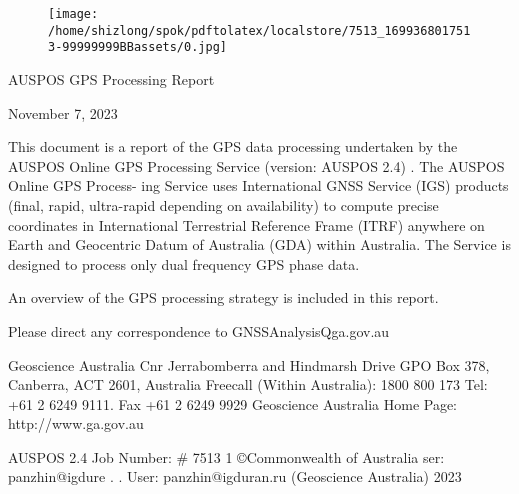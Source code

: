 \documentclass[a4paper,12pt]{article}
\begin{document}
\begin{figure}[h]

\texttt{[image: /home/shizlong/spok/pdftolatex/localstore/7513\_1699368017513-99999999BBassets/0.jpg]}

\centering

\end{figure}

    AUSPOS GPS Processing Report 

\vspace{10pt}

    November 7, 2023 

\vspace{10pt}

    This document is a report of the GPS data processing undertaken by the AUSPOS Online  GPS Processing Service (version: AUSPOS 2.4) . The AUSPOS Online GPS Process-  ing Service uses International GNSS Service (IGS) products (final, rapid, ultra-rapid  depending on availability) to compute precise coordinates in International Terrestrial  Reference Frame (ITRF) anywhere on Earth and Geocentric Datum of Australia (GDA)  within Australia. The Service is designed to process only dual frequency GPS phase data. 

\vspace{10pt}

    An overview of the GPS processing strategy is included in this report. 

\vspace{10pt}

    Please direct any correspondence to GNSSAnalysisQga.gov.au 

\vspace{10pt}

    Geoscience Australia   Cnr Jerrabomberra and Hindmarsh Drive  GPO Box 378, Canberra, ACT 2601, Australia  Freecall (Within Australia): 1800 800 173   Tel: +61 2 6249 9111. Fax +61 2 6249 9929  Geoscience Australia   Home Page: http://www.ga.gov.au 

\vspace{10pt}

         AUSPOS 2.4 Job Number: \# 7513 1 ©Commonwealth of Australia    ser: panzhin@igdure . .  User: panzhin@igduran.ru (Geoscience Australia) 2023 

\vspace{10pt}

\par

\vspace{10pt}
\end{document}
